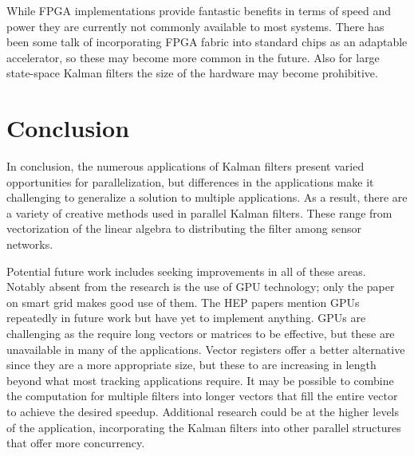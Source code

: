 \documentclass[11pt]{article}
\begin{document}
While FPGA implementations provide fantastic benefits in terms of speed and power they are currently not commonly available to most systems. There has been some talk of incorporating FPGA fabric into standard chips as an adaptable accelerator, so these may become more common in the future. Also for large state-space Kalman filters the size of the hardware may become prohibitive.

\section{Conclusion}
In conclusion, the numerous applications of Kalman filters present varied opportunities for parallelization, but differences in the applications make it challenging to generalize a solution to multiple applications. As a result, there are a variety of creative methods used in parallel Kalman filters. These range from vectorization of the linear algebra to distributing the filter among sensor networks.

Potential future work includes seeking improvements in all of these areas. Notably absent from the research is the use of GPU technology; only the paper on smart grid makes good use of them. The HEP papers mention GPUs repeatedly in future work but have yet to implement anything. GPUs are challenging as the require long vectors or matrices to be effective, but these are unavailable in many of the applications. Vector registers offer a better alternative since they are a more appropriate size, but these to are increasing in length beyond what most tracking applications require. It may be possible to combine the computation for multiple filters into longer vectors that fill the entire vector to achieve the desired speedup. Additional research could be at the higher levels of the application, incorporating the Kalman filters into other parallel structures that offer more concurrency.

\nocite{*}


\end{document}
